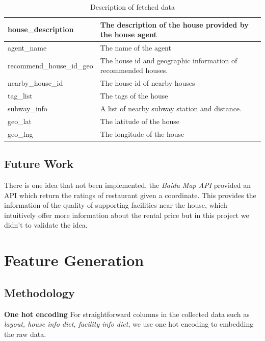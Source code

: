 \documentclass[final]{cvpr}
\begin{document}
\begin{table}[h]
\begin{tabular}{|l|l|}
house\_description        & The description of the house provided by the house agent                       \\ \hline
agent\_name               & The name of the agent                                                          \\ \hline
recommend\_house\_id\_geo & The house id and geographic information of recommended houses.                 \\ \hline
nearby\_house\_id         & The house id of nearby houses                                                  \\ \hline
tag\_list                 & The tags of the house                                                          \\ \hline
subway\_info              & A list of nearby subway station and distance.                                  \\ \hline
geo\_lat                  & The latitude of the house                                                      \\ \hline
geo\_lng                  & The longitude of the house                                                     \\ \hline
\end{tabular}
\caption{Description of fetched data}
\label{tab:my-table1}
\end{table}

\subsection{Future Work}
There is one idea that not been implemented, the \textit{Baidu Map API} provided an API which return the ratings of restaurant given a coordinate. This provides the information of the quality of supporting facilities near the house, which intuitively offer more information about the rental price but in this project we didn't to validate the idea.

\section{Feature Generation}
\subsection{Methodology}
\textbf{One hot encoding} For straightforward columns in the collected data such as \textit{layout, house info dict, facility info dict}, we use one hot encoding to embedding the raw data.
\end{document}
